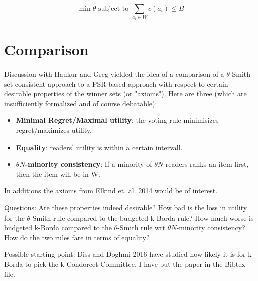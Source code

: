 \documentclass[10pt,a4paper]{article}
\begin{document}
\[\min \theta \text{ subject to } \sum_{a_i\in W}c(a_i)\leq B\]

\section{Comparison}

Discussion with Haukur and Greg yielded the idea of a comparison of a $\theta$-Smith-set-consistent approach to a PSR-based approach with respect
to certain desirable properties of the winner sets (or "axioms"). Here are three (which are insufficiently formalized and of course debatable):

\begin{itemize}
\item \textbf{Minimal Regret/Maximal utility}: the voting rule minimisizes regret/maximizes utility.
\item \textbf{Equality}: readers' utility is within a certain intervall.
\item \textbf{$\theta N$-minority consistency}: If a minority of $\theta N$-readers ranks an item first, then the item will be in W.



\end{itemize}

In additions the axioms from Elkind et. al. 2014 would be of interest.

Questions: Are these properties indeed desirable? How bad is the loss in utility for the $\theta$-Smith rule compared to the budgeted k-Borda
rule? How much worse is budgeted k-Borda compared to the $\theta$-Smith rule wrt $\theta N$-minority consistency? How do the two rules fare in
terms of equality?

Possible starting point: Diss and Doghmi 2016 have studied how likely it is for k-Borda to pick the k-Condorcet Committee. I have put the paper
in the Bibtex file.
\end{document}

